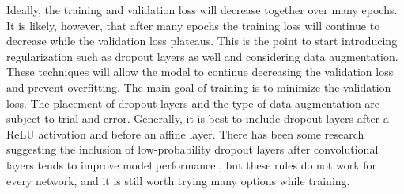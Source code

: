 Ideally, the training and validation loss will decrease together over many epochs. It is likely, however, that after many epochs the training loss will continue to decrease while the validation loss plateaus. This is the point to start introducing regularization such as dropout layers as well and considering data augmentation. These techniques will allow the model to continue decreasing the validation loss and prevent overfitting. The main goal of training is to minimize the validation loss. The placement of dropout layers and the type of data augmentation are subject to trial and error. Generally, it is best to include dropout layers after a ReLU activation and before an affine layer. There has been some research suggesting the inclusion of low-probability dropout layers after convolutional layers tends to improve model performance \cite{conv-dropout-layers} \cite{conv-dropout-layers2}, but these rules do not work for every network, and it is still worth trying many options while training.







